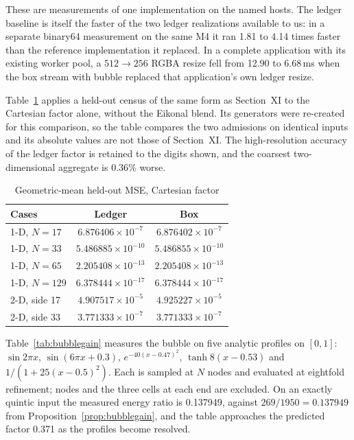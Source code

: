 \documentclass[journal]{IEEEtran}
\begin{document}
These are measurements of one implementation on the named hosts. The
ledger baseline is itself the faster of the two ledger realizations
available to us: in a separate binary64 measurement on the same M4 it
ran 1.81 to 4.14 times faster than the reference implementation it
replaced. In a complete application with its existing worker pool, a
\(512\to256\) RGBA resize fell from 12.90 to 6.68\,ms when the box
stream with bubble replaced that application's own ledger resize.

Table~\ref{tab:boxcensus} applies a held-out census of the same form as
Section~XI to the Cartesian factor alone, without the Eikonal blend.
Its generators were re-created for this comparison, so the table
compares the two admissions on identical inputs and its absolute values
are not those of Section~XI. The high-resolution accuracy of the ledger
factor is retained to the digits shown, and the coarsest
two-dimensional aggregate is 0.36\% worse.

\begin{table}[H]
\caption{Geometric-mean held-out MSE, Cartesian factor}
\label{tab:boxcensus}
\centering
\scriptsize
\begin{tabular}{l|cc}
\hline
Cases & Ledger & Box\\
\hline
1-D, $N=17$  & $6.876406\times10^{-7}$  & $6.876402\times10^{-7}$\\
1-D, $N=33$  & $5.486885\times10^{-10}$ & $5.486855\times10^{-10}$\\
1-D, $N=65$  & $2.205408\times10^{-13}$ & $2.205408\times10^{-13}$\\
1-D, $N=129$ & $6.378444\times10^{-17}$ & $6.378444\times10^{-17}$\\
2-D, side 17 & $4.907517\times10^{-5}$  & $4.925227\times10^{-5}$\\
2-D, side 33 & $3.771333\times10^{-7}$  & $3.771333\times10^{-7}$\\
\hline
\end{tabular}
\end{table}

Table~\ref{tab:bubblegain} measures the bubble on five analytic
profiles on \([0,1]\): \(\sin2\pi x\), \(\sin(6\pi x+0.3)\),
\(e^{-40(x-0.47)^2}\), \(\tanh8(x-0.53)\) and \(1/(1+25(x-0.5)^2)\).
Each is sampled at \(N\) nodes and evaluated at eightfold refinement;
nodes and the three cells at each end are excluded. On an exactly
quintic input the measured energy ratio is 0.137949, against
\(269/1950=0.137949\) from Proposition~\ref{prop:bubblegain}, and the
table approaches the predicted factor 0.371 as the profiles become
resolved.
\end{document}
